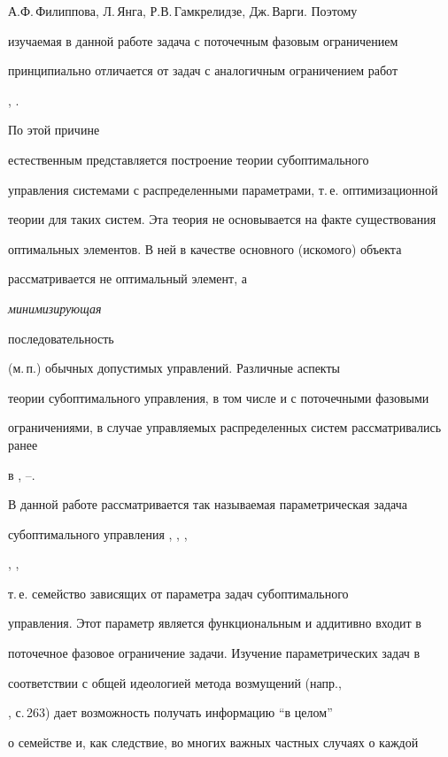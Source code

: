 А.Ф.\,Филиппова, Л.\,Янга, Р.В.\,Гамкрелидзе, Дж.\,Варги. Поэтому 


изучаемая в данной работе задача с поточечным фазовым ограничением


принципиально отличается от задач с аналогичным ограничением работ


\cite{sumin00b}, \cite{sumin00c}.





По этой причине


естественным представляется построение теории субоптимального


управления системами с распределенными параметрами, т.\,е. оптимизационной


теории для таких систем. Эта теория не основывается на факте существования


оптимальных элементов. В ней в качестве основного (искомого) объекта


рассматривается не оптимальный элемент, а {\it минимизирующая


последовательность} (м.\,п.) обычных допустимых управлений. Различные аспекты


теории субоптимального управления, в том числе и с поточечными фазовыми


ограничениями, в случае управляемых распределенных систем рассматривались ранее


в \cite{SuminD}, \cite{sumin00b}--\cite{sumin97b}.








В данной работе рассматривается так называемая параметрическая задача


субоптимального управления \cite{SuminD}, \cite{sumin00b}, \cite{sumin00c},


\cite{sumin97a}, \cite{sumin97b},


т.\,е. семейство зависящих от параметра задач субоптимального


управления.  Этот параметр является функциональным и аддитивно входит в


поточечное фазовое ограничение задачи. Изучение параметрических задач в


соответствии с общей идеологией метода возмущений (напр.,


\cite{altifom}, с.\,263) дает возможность получать информацию ``в целом''


о семействе и, как следствие, во многих важных частных случаях о каждой 


